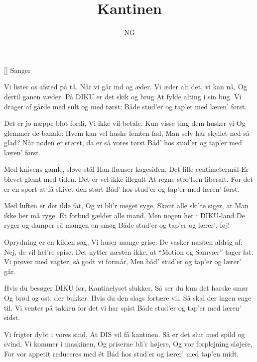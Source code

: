 \documentclass[a4paper,11pt]{article}
\title{Kantinen}
\author{NG}
\begin{document}
\maketitle

\begin{roles}
[] Sanger
\end{roles}


\begin{song}
%
Vi lister os afsted på tå,
Når vi går ind og æder.
Vi æder alt det, vi kan nå,
Og dertil ganen væder.
På DIKU er det skik og brug
At fylde alting i sin bug.
Vi drager af gårde med sult og med tørst:
Både stud'er og tap'er med læren' først.

Det er jo næppe blot fordi,
Vi ikke vil betale.
Kun visse ting dem husker vi
Og glemmer de banale:
Hvem kan vel huske femten fad,
Man selv har skyllet ned så glad?
Når nøden er størst, da er så vores tørst
Båd' hos stud'er og tap'er med læren' først.

Med knivens gamle, sløve stål
Han flænser kagesiden.
Det lille centimetermål
Er blevet glemt med tiden.
Det er vel ikke illegalt
At regne stør'lsen liberalt,
For det er en sport at få skivet den størt
Båd' hos stud'er og tap'er med læren' først.

Med luften er det ilde fat,
Og vi bli'r meget syge,
Skønt alle skilte siger, at
Man ikke her må ryge.
Et forbud gælder alle mand,
Men nogen her i DIKU-land
De ryger og damper så mangen en smøg
Både stud'er og tap'er og lærer', føj!

Oprydning er en kilden sag,
Vi huser mange grise.
De vasker næsten aldrig af;
Nej, de vil hel're spise.
Det nytter næsten ikke, at
``Motion og Samvær'' tager fat.
Vi prøver med vagter, så godt vi formår,
Men båd' stud'er og tap'er og lærer' går.

Hvis du besøger DIKU før,
Kantinelyset slukker,
Så ser du kun det harske smør
Og brød og ost, der bukker.
Hvis du den slags fortære vil,
Så skal der ingen enge til.
Vi venter på takken for det vi har spist
Både stud'er og tap'er med læren' sidst.

Vi frigter dybt i vores sind,
At DIS vil få kantinen.
Så er det slut med spild og svind,
Vi kommer i maskinen,
Og priserne bli'r højere,
Og vor forplejning sløjere,
For vor appetit reduceres med ét
Båd hos stud'er og lærer' med tap'en midt.
\end{song}
\end{document}
